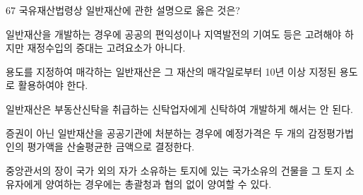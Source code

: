 \begin{question}{67}
국유재산법령상 일반재산에 관한 설명으로 옳은 것은?
\begin{choices}
  \item 일반재산을 개발하는 경우에 공공의 편익성이나 지역발전의 기여도 등은 고려해야 하지만 재정수입의 증대는 고려요소가 아니다.
  \item 용도를 지정하여 매각하는 일반재산은 그 재산의 매각일로부터 10년 이상 지정된 용도로 활용하여야 한다.
  \item 일반재산은 부동산신탁을 취급하는 신탁업자에게 신탁하여 개발하게 해서는 안 된다.
  \item 증권이 아닌 일반재산을 공공기관에 처분하는 경우에 예정가격은 두 개의 감정평가법인의 평가액을 산술평균한 금액으로 결정한다.
  \item 중앙관서의 장이 국가 외의 자가 소유하는 토지에 있는 국가소유의 건물을 그 토지 소유자에게 양여하는 경우에는 총괄청과 협의 없이 양여할 수 있다.
\end{choices}
\end{question}
